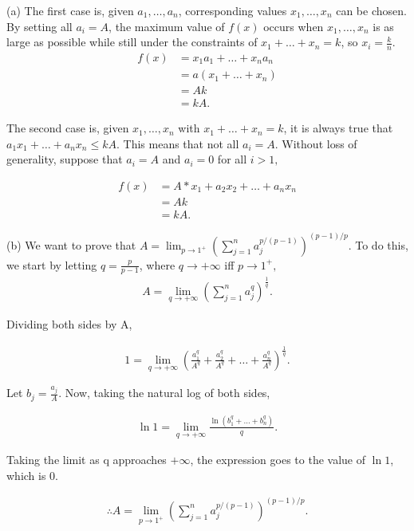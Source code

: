 \documentclass[12pt,a4paper]{article}
\begin{document}
 \vspace{1cm}
 
(a) The first case is, given $a_1,\dots,a_n$, corresponding values $x_1,\dots,x_n$ can be chosen. By setting all $a_i=A$, the maximum value of $f(x)$ occurs when $x_1,\dots,x_n$ is as large as possible while still under the constraints of $x_1+\dots+x_n=k$, so $x_i=\frac{k}{n}$. \\
\begin{align*}
	f(x)&=x_1a_1+\dots+x_na_n \\
	&=a(x_1+\dots+x_n) \\
	&=Ak \\
	&=kA.
\end{align*}

The second case is, given $x_1,\dots,x_n$ with $x_1+\dots+x_n=k$, it is always true that $a_1x_1+\dots+a_nx_n\leq{}kA.$ This means that not all $a_i=A.$ Without loss of generality, suppose that $a_i=A$ and $a_i=0$ for all $i>1,$

\begin{align*}
	f(x)&=A*x_1+a_2x_2+\dots+a_nx_n \\
	&=Ak \\
	&=kA.
\end{align*}

(b) We want to prove that $A=\lim _{p \rightarrow 1^{+}}\left(\sum_{j=1}^{n} a_{j}^{p /(p-1)}\right)^{(p-1) / p}$. To do this, we start by letting $q=\frac{p}{p-1}$, where $q\rightarrow+\infty$ iff $p\rightarrow1^+,$
\begin{align*}
	A=\lim _{q\rightarrow+\infty}\left(\sum_{j=1}^{n} a_{j}^{q}\right)^{\frac{1}{q}}.
\end{align*} 

Dividing both sides by A,

\begin{align*}
	1=\lim_{q\rightarrow+\infty}\left(\frac{a_1^q}{A^q}+\frac{a_2^q}{A^q}+\dots+\frac{a_n^q}{A^q}				\right)^\frac{1}{q}.
\end{align*}

Let $b_j=\frac{a_j}{A}.$ Now, taking the natural log of both sides,

\begin{align*}
	\ln{1}=\lim_{q\rightarrow+\infty}\frac{\ln{\left(b_1^q+\dots+b_n^q\right)}}{q}.
\end{align*}

Taking the limit as q approaches $+\infty$, the expression goes to the value of $\ln{1}$, which is 0.

\begin{align*}
\therefore{}A=\lim _{p \rightarrow 1^{+}}\left(\sum_{j=1}^{n} a_{j}^{p /(p-1)}\right)^{(p-1) / p}.
\end{align*}

 
\end{document}
